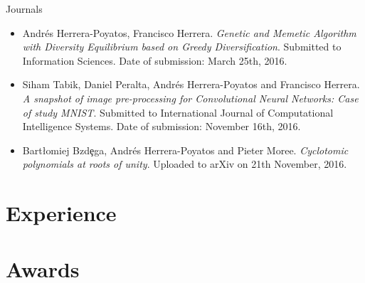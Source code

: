 \documentclass[10pt,a4paper,sans]{moderncv} %
\begin{document}
	{\large \textcolor{color1}{Journals}}

		\begin{itemize}
			\item Andrés Herrera-Poyatos, Francisco Herrera. \textit{Genetic and Memetic Algorithm with Diversity Equilibrium based on Greedy Diversification}. Submitted to Information Sciences. Date of submission: March 25th, 2016.
			\item Siham Tabik, Daniel Peralta, Andrés Herrera-Poyatos and Francisco Herrera. \textit{A snapshot of image pre-processing for Convolutional Neural Networks: Case of study MNIST}. Submitted to International Journal of Computational Intelligence Systems. Date of submission: November 16th, 2016.
			\item Bart{\l}omiej Bzd\c{e}ga, Andr\'es Herrera-Poyatos and Pieter Moree. \textit{Cyclotomic polynomials at roots of unity}. Uploaded to arXiv on 21th November, 2016.
		\end{itemize}
	


\section{Experience}

	
		
	

\section{Awards}
\end{document}
